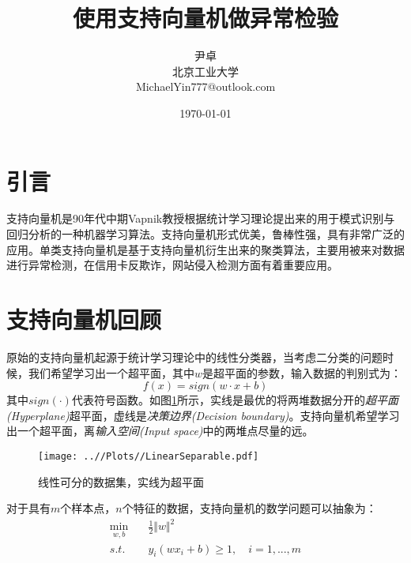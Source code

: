 \documentclass[UTF8, 12pt]{ctexart}
\begin{document}
\title{\heiti 使用支持向量机做异常检验}
\author{\kaishu 尹卓\\北京工业大学\\MichaelYin777@outlook.com}
\date{\today}
\maketitle

\tableofcontents
\newpage
\section{引言}
支持向量机是90年代中期Vapnik教授根据统计学习理论提出来的用于模式识别与回归分析的一种机器学习算法。支持向量机形式优美，鲁棒性强，具有非常广泛的应用。单类支持向量机是基于支持向量机衍生出来的聚类算法，主要用被来对数据进行异常检测，在信用卡反欺诈，网站侵入检测方面有着重要应用。
\section{支持向量机回顾}

原始的支持向量机起源于统计学习理论中的线性分类器，当考虑二分类的问题时候，我们希望学习出一个超平面，其中$w$是超平面的参数，输入数据的判别式为：
\begin{equation}
	f(x) = sign(w·x+b)
\end{equation}
其中$sign(·)$代表符号函数。如图\ref{Fig:1}所示，实线是最优的将两堆数据分开的\emph{超平面(Hyperplane)}超平面，虚线是\emph{决策边界(Decision boundary)}。支持向量机希望学习出一个超平面，离\emph{输入空间(Input space)}中的两堆点尽量的远。

\begin{figure}[H]
	\centering
	\texttt{[image: ..//Plots//LinearSeparable.pdf]}
	\caption{线性可分的数据集，实线为超平面}
	\label{Fig:1}
	\vspace{-0.5em}
\end{figure}

对于具有$m$个样本点，$n$个特征的数据，支持向量机的数学问题可以抽象为：
\begin{align}
	\min_{w,b} &  \quad \frac{1}{2}{\Vert w \Vert}^{2} \\
	s.t. &  \quad y_{i}(wx_{i}+b) \geq 1, \quad i = 1, ..., m
\end{align}
\end{document}
